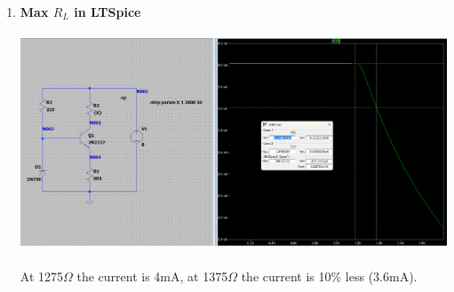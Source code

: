 \documentclass{article}
\begin{document}
\begin{enumerate}
		\pagebreak
		\item  \textbf{Max \(R_L\) in LTSpice}\\\\
		\includegraphics[scale=0.4]{prelab 3/prelab 3 ex2 rl}\\\\
		At 1275\(\Omega\) the current is 4mA, at 1375\(\Omega\) the current is 10\% less (3.6mA).  
	\end{enumerate}
\end{document}
